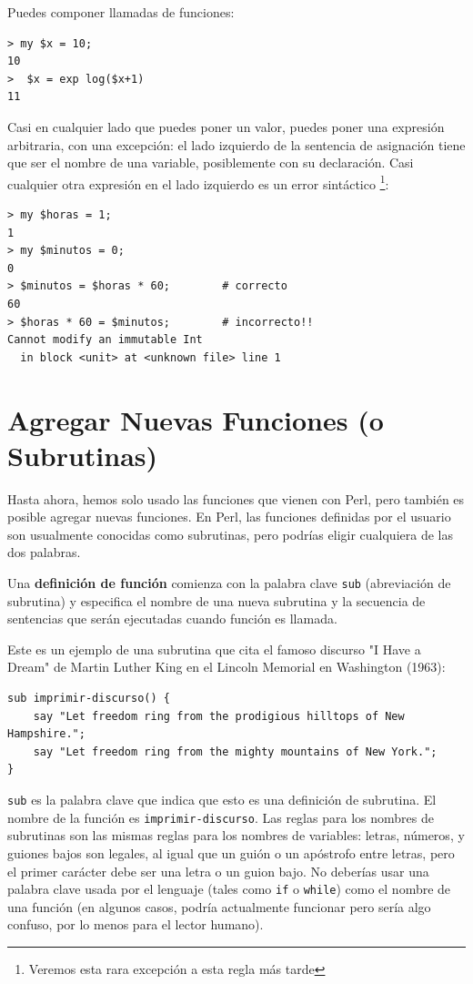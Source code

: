 Puedes componer llamadas de funciones:

\begin{lstlisting}
> my $x = 10;
10
>  $x = exp log($x+1)
11
\end{lstlisting}
%
Casi en cualquier lado que puedes poner un valor, puedes poner
una expresión arbitraria, con una excepción: el lado izquierdo 
de la sentencia de asignación tiene que ser el nombre de una
variable, posiblemente con su declaración. Casi cualquier otra expresión
en el lado izquierdo es un error sintáctico \footnote{Veremos esta rara
excepción a esta regla más tarde}:


\begin{lstlisting}
> my $horas = 1;
1
> my $minutos = 0;
0
> $minutos = $horas * 60;        # correcto 
60
> $horas * 60 = $minutos;        # incorrecto!!
Cannot modify an immutable Int
  in block <unit> at <unknown file> line 1
\end{lstlisting}
%


\section{Agregar Nuevas Funciones (o Subrutinas)}

Hasta ahora, hemos solo usado las funciones que vienen con Perl,
pero también es posible agregar nuevas funciones. En Perl, las 
funciones definidas por el usuario son usualmente conocidas 
como subrutinas, pero podrías eligir cualquiera de las dos
palabras. 

Una {\bf definición de función} comienza con la palabra clave 
{\tt sub} (abreviación de subrutina) y especifica el nombre de una
nueva subrutina y la secuencia de sentencias que serán ejecutadas
cuando función es llamada.

Este es un ejemplo de una subrutina que cita el famoso discurso
"I Have a Dream" de Martin Luther King en el Lincoln Memorial en
Washington (1963):

\begin{lstlisting}
sub imprimir-discurso() {
    say "Let freedom ring from the prodigious hilltops of New Hampshire.";
    say "Let freedom ring from the mighty mountains of New York.";
}
\end{lstlisting}
%
{\tt sub} es la palabra clave que indica que esto es una definición 
de subrutina. El nombre de la función es \verb|imprimir-discurso|.
Las reglas para los nombres de subrutinas son las mismas reglas 
para los nombres de variables: letras, números, y guiones bajos son
legales, al igual que un guión o un apóstrofo entre letras, pero
el primer carácter debe ser una letra o un guion bajo. No deberías
usar una palabra clave usada por el lenguaje (tales como {\tt if} 
o {\tt while}) como el nombre de una función (en algunos casos, podría
actualmente funcionar pero sería algo confuso, por lo menos 
para el lector humano).

